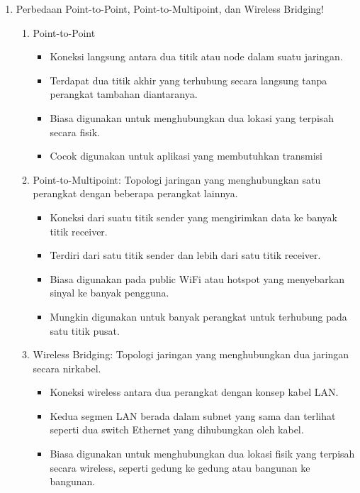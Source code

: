 \begin{enumerate}
  \item Perbedaan Point-to-Point, Point-to-Multipoint, dan Wireless Bridging!
      \begin{enumerate}
          \item Point-to-Point
          \begin{itemize}
              \item Koneksi langsung antara dua titik atau node dalam suatu jaringan.
              \item Terdapat dua titik akhir yang terhubung secara langsung tanpa perangkat tambahan diantaranya.
              \item Biasa digunakan untuk menghubungkan dua lokasi yang terpisah secara fisik.
              \item Cocok digunakan untuk aplikasi yang membutuhkan transmisi
          \end{itemize}
          \item Point-to-Multipoint: Topologi jaringan yang menghubungkan satu perangkat dengan beberapa perangkat lainnya.
          \begin{itemize}
              \item Koneksi dari suatu titik sender  yang mengirimkan data ke banyak titik receiver.
              \item Terdiri dari satu titik sender dan lebih dari satu titik receiver.
              \item Biasa digunakan pada public WiFi atau hotspot yang menyebarkan sinyal ke banyak pengguna.
              \item Mungkin digunakan untuk banyak perangkat untuk terhubung pada satu titik pusat.
          \end{itemize}
          \item Wireless Bridging: Topologi jaringan yang menghubungkan dua jaringan secara nirkabel.
          \begin{itemize}
              \item Koneksi wireless antara dua perangkat dengan konsep kabel LAN.
              \item Kedua segmen LAN berada dalam subnet yang sama dan terlihat seperti dua switch Ethernet yang dihubungkan oleh kabel.
              \item Biasa digunakan untuk menghubungkan dua lokasi fisik yang terpisah secara wireless, seperti gedung ke gedung atau bangunan ke bangunan.
          \end{itemize}
      \end{enumerate}
        

\end{enumerate}
